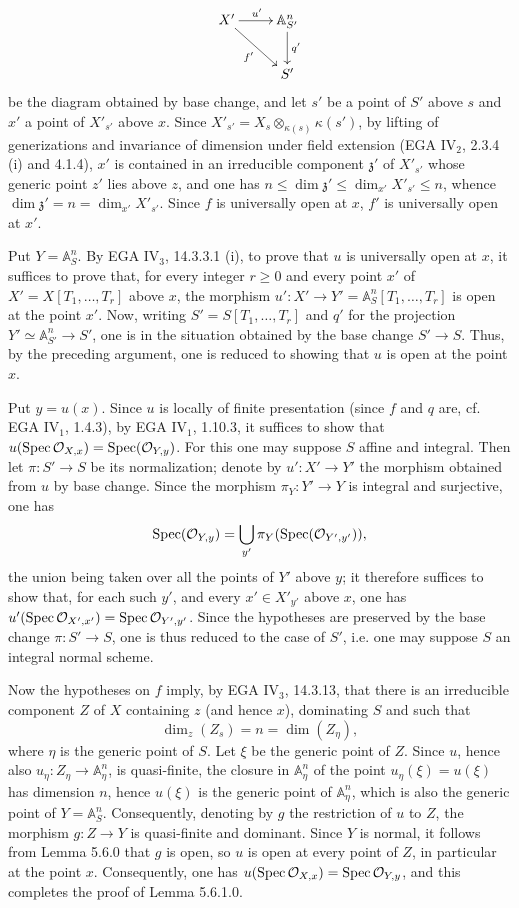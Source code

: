 \[
\xymatrix{X'\ar[r]^{u'}\ar[dr]_{f'}&\mathbb A_{S'}^n\ar[d]^{q'}\\&S'}
\]
be the diagram obtained by base change, and let $s'$ be a point of $S'$ above $s$ and $x'$ a point of $X'_{s'}$ above $x$. Since $X'_{s'}=X_s\otimes_{\kappa(s)}\kappa(s')$, by lifting of generizations and invariance of dimension under field extension (EGA IV$_2$, 2.3.4 (i) and 4.1.4), $x'$ is contained in an irreducible component $\mathfrak z'$ of $X'_{s'}$ whose generic point $z'$ lies above $z$, and one has $n\le\dim\mathfrak z'\le\dim_{x'}X'_{s'}\le n$, whence $\dim\mathfrak z'=n=\dim_{x'}X'_{s'}$. Since $f$ is universally open at $x$, $f'$ is universally open at $x'$.

Put $Y=\mathbb A_S^n$. By EGA IV$_3$, 14.3.3.1 (i), to prove that $u$ is universally open at $x$, it suffices to prove that, for every integer $r\ge0$ and every point $x'$ of $X'=X[T_1,\ldots,T_r]$ above $x$, the morphism $u':X'\to Y'=\mathbb A_S^n[T_1,\ldots,T_r]$ is open at the point $x'$. Now, writing $S'=S[T_1,\ldots,T_r]$ and $q'$ for the projection $Y'\simeq\mathbb A_{S'}^n\to S'$, one is in the situation obtained by the base change $S'\to S$. Thus, by the preceding argument, one is reduced to showing that $u$ is open at the point $x$.

Put $y=u(x)$. Since $u$ is locally of finite presentation (since $f$ and $q$ are, cf. EGA IV$_1$, 1.4.3), by EGA IV$_1$, 1.10.3, it suffices to show that $u(\operatorname{Spec}\mathcal{O}_{X,x})=\operatorname{Spec}(\mathcal{O}_{Y,y})$. For this one may suppose $S$ affine and integral. Then let $\pi:S'\to S$ be its normalization; denote by $u':X'\to Y'$ the morphism obtained from $u$ by base change. Since the morphism $\pi_Y:Y'\to Y$ is integral and surjective, one has
\[
\operatorname{Spec}(\mathcal{O}_{Y,y})=\bigcup_{y'}\pi_Y(\operatorname{Spec}(\mathcal{O}_{Y',y'})),
\]
the union being taken over all the points of $Y'$ above $y$; it therefore suffices to show that, for each such $y'$, and every $x'\in X'_{y'}$ above $x$, one has $u'(\operatorname{Spec}\mathcal{O}_{X',x'})=\operatorname{Spec}\mathcal{O}_{Y',y'}$. Since the hypotheses are preserved by the base change $\pi:S'\to S$, one is thus reduced to the case of $S'$, i.e. one may suppose $S$ an integral normal scheme.

Now the hypotheses on $f$ imply, by EGA IV$_3$, 14.3.13, that there is an irreducible component $Z$ of $X$ containing $z$ (and hence $x$), dominating $S$ and such that
\[
\dim_z(Z_s)=n=\dim(Z_\eta),
\]
where $\eta$ is the generic point of $S$. Let $\xi$ be the generic point of $Z$. Since $u$, hence also $u_\eta:Z_\eta\to\mathbb A_\eta^n$, is quasi-finite, the closure in $\mathbb A_\eta^n$ of the point $u_\eta(\xi)=u(\xi)$ has dimension $n$, hence $u(\xi)$ is the generic point of $\mathbb A_\eta^n$, which is also the generic point of $Y=\mathbb A_S^n$. Consequently, denoting by $g$ the restriction of $u$ to $Z$, the morphism $g:Z\to Y$ is quasi-finite and dominant. Since $Y$ is normal, it follows from Lemma 5.6.0 that $g$ is open, so $u$ is open at every point of $Z$, in particular at the point $x$. Consequently, one has $u(\operatorname{Spec}\mathcal{O}_{X,x})=\operatorname{Spec}\mathcal{O}_{Y,y}$, and this completes the proof of Lemma 5.6.1.0.

